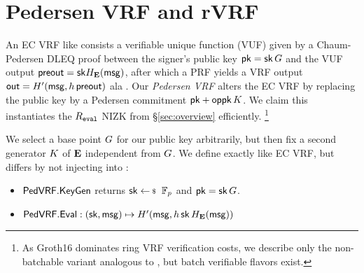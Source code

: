 \section{Pedersen VRF and rVRF}
\label{sec:pederson_vrf}


An EC VRF like \cite{nsec5,VXEd25519,draft-irtf-cfrg-vrf-10} consists
a verifiable unique function (VUF) given by a Chaum-Pedersen DLEQ proof
between the signer's public key $\mathsf{pk} = \mathsf{sk} \, G$ and
 the VUF output ${\mathsf{preout}} = \mathsf{sk} H_{{\mathbf{E}}}(\mathsf{msg})$,
after which a PRF  yields a VRF output
 ${\mathsf{out}} = H'(\mathsf{msg}, h \, {\mathsf{preout}})$ ala \cite[Proposition 1]{vrf_micali}.
%
Our {\em Pedersen VRF} \PedVRF alters the EC VRF by replacing the
public key by a Pedersen commitment $\mathsf{pk} + \mathsf{oppk} \, K$.
We claim this instantiates the $R_{\mathtt{eval}}$ NIZK from \S\ref{sec:overview} efficiently.
\footnote{As Groth16 dominates ring VRF verification costs,
we describe only the non-batchable variant analogous to
\cite{nsec5,VXEd25519,draft-irtf-cfrg-vrf-10}, but
 batch verifiable flavors exist.}


We select a base point $G$ for our public key arbitrarily, %
but then fix a second generator $K$ of ${\mathbf{E}}$ independent from $G$.
%
We define \KeyGen exactly like EC VRF, but
 \Eval differs by not injecting \pk into \msg:
\begin{itemize}
\item ${\mathsf{PedVRF}}.{\mathsf{KeyGen}}$ \quad returns $\sk \leftsample \F_p$ and $\mathsf{pk} = \mathsf{sk} \, G$.
\item ${\mathsf{PedVRF}}.{\mathsf{Eval}} : (\mathsf{sk},\mathsf{msg}) \mapsto H'(\mathsf{msg}, h \, \mathsf{sk} \, H_{{\mathbf{E}}}(\mathsf{msg}))$
\end{itemize}

